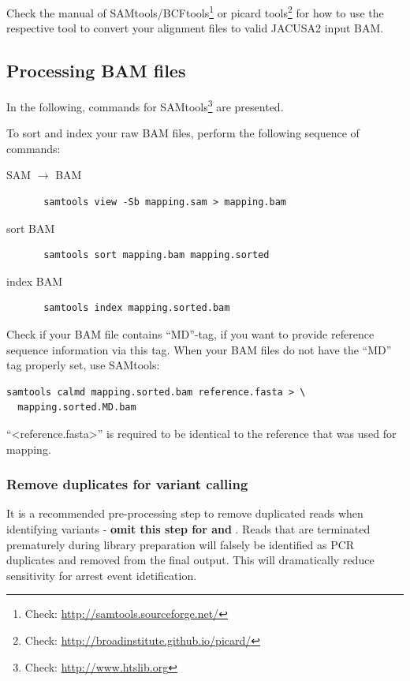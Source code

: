 \documentclass[10pt,a4paper,final]{article}
\begin{document}
Check the manual of SAMtools/BCFtools\footnote{Check: \url{http://samtools.sourceforge.net/}} or
picard tools\footnote{Check: \url{http://broadinstitute.github.io/picard/}} for how to use the respective 
tool to convert your alignment files to valid JACUSA2 input BAM.
\subsection{Processing BAM files}
In the following, commands for SAMtools\footnote{Check: \url{http://www.htslib.org}} are presented.

To sort and index your raw BAM files, perform the following sequence of commands:
\begin{description}
  \item[SAM $\rightarrow$ BAM] \begin{verbatim} samtools view -Sb mapping.sam > mapping.bam \end{verbatim} 
  \item[sort BAM] \begin{verbatim} samtools sort mapping.bam mapping.sorted \end{verbatim} 
  \item[index BAM] \begin{verbatim} samtools index mapping.sorted.bam \end{verbatim}
\end{description}

Check if your BAM file contains ``MD''-tag, if you want to provide reference sequence information 
via this tag. When your BAM files do not have the ``MD'' tag properly set, use SAMtools:
\begin{verbatim}
samtools calmd mapping.sorted.bam reference.fasta > \
  mapping.sorted.MD.bam
\end{verbatim}
``<reference.fasta>'' is required to be identical to the reference that was used for mapping. 
\subsubsection{Remove duplicates for variant calling}
It is a recommended pre-processing step to remove duplicated reads when identifying variants -
\textbf{omit this step for \rtarrest and \lrtarrest}. Reads that are terminated prematurely during
library preparation will falsely be identified as PCR duplicates and removed from the final output.
This will dramatically reduce sensitivity for arrest event idetification.
\end{document}
